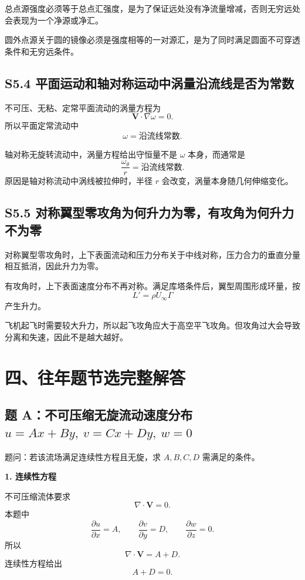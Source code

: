 \documentclass[UTF8,zihao=-4]{ctexart}
\begin{document}
总点源强度必须等于总点汇强度，是为了保证远处没有净流量增减，否则无穷远处会表现为一个净源或净汇。

圆外点源关于圆的镜像必须是强度相等的一对源汇，是为了同时满足圆面不可穿透条件和无穷远条件。

\subsection*{S5.4 平面运动和轴对称运动中涡量沿流线是否为常数}

不可压、无粘、定常平面流动的涡量方程为
\[
\bm V\cdot\nabla\omega=0.
\]
所以平面定常流动中
\[
\boxed{\omega=\text{沿流线常数}.}
\]

轴对称无旋转流动中，涡量方程给出守恒量不是 \(\omega\) 本身，而通常是
\[
\boxed{\frac{\omega_\theta}{r}=\text{沿流线常数}.}
\]
原因是轴对称流动中涡线被拉伸时，半径 \(r\) 会改变，涡量本身随几何伸缩变化。

\subsection*{S5.5 对称翼型零攻角为何升力为零，有攻角为何升力不为零}

对称翼型零攻角时，上下表面流动和压力分布关于中线对称，压力合力的垂直分量相互抵消，因此升力为零。

有攻角时，上下表面速度分布不再对称。满足库塔条件后，翼型周围形成环量，按
\[
L'=\rho U_\infty\Gamma
\]
产生升力。

飞机起飞时需要较大升力，所以起飞攻角应大于高空平飞攻角。但攻角过大会导致分离和失速，因此不是越大越好。

\section*{四、往年题节选完整解答}

\subsection*{题 A：不可压缩无旋流动速度分布 \(u=Ax+By,\ v=Cx+Dy,\ w=0\)}

题问：若该流场满足连续性方程且无旋，求 \(A,B,C,D\) 需满足的条件。

\textbf{1. 连续性方程}

不可压缩流体要求
\[
\nabla\cdot\bm V=0.
\]
本题中
\[
\frac{\partial u}{\partial x}=A,\qquad
\frac{\partial v}{\partial y}=D,\qquad
\frac{\partial w}{\partial z}=0.
\]
所以
\[
\nabla\cdot\bm V=A+D.
\]
连续性方程给出
\[
\boxed{A+D=0.}
\]
\end{document}
